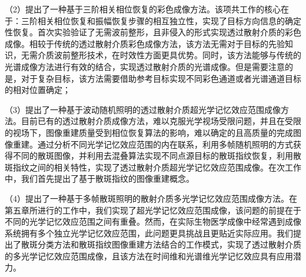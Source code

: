 （2）提出了一种基于三阶相关相位恢复的彩色成像方法。该项共工作的核心在于：三阶相关相位恢复和振幅恢复步骤的相互独立性，实现了目标方向信息的确定性恢复。首次实验验证了无需波前整形，且非侵入的形式实现透过散射介质的彩色成像。相较于传统的透过散射介质彩色成像方法，该方法无需对于目标的先验知识，无需介质波前整形技术，在时效性方面更具优势。同时，该方法能够与传统的光谱成像方法进行有效的结合，实现透过散射介质的光谱成像。但是需要注意的是，对于复杂目标，该方法需要借助参考目标实现不同彩色通道或者光谱通道目标的相对位置确定；

（3）提出了一种基于波动随机照明的透过散射介质超光学记忆效应范围成像方法。目前已有的透过散射介质成像方法，难以克服光学视场受限问题，并且在受限的视场下，图像重建质量受到相位恢复算法的影响，难以确定的且高质量的完成图像重建。通过分析不同光学记忆效应范围的内在联系，利用多帧随机照明的方式获得不同的散斑图像，并利用去混叠算法实现不同点源目标的散斑指纹恢复，利用散斑指纹之间的相关特性，实现了透过散射介质超光学记忆效应范围成像。在次工作中，我们首先提出了基于散斑指纹的图像重建概念。

（4）提出了一种基于多帧散斑照明的散射介质多光学记忆效应范围成像方法。在第五章所进行的工作中，我们实现了超光学记忆效应范围成像，该问题的前提在于不同的光学记忆效应范围之间有重叠。然而，在实际生物医学成像中经常遇到成像系统拥有多个独立光学记忆效应范围，此问题更具挑战且更贴近实际应用。我们提出了散斑分类方法和散斑指纹图像重建方法结合的工作模式，实现了透过散射介质的多光学记忆效应范围成像，且该方法在时间维和光谱维光学记忆效应具有应用潜力。
